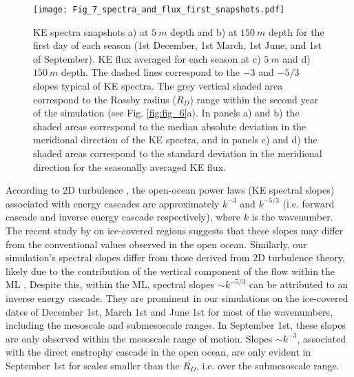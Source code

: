 \documentclass[draft]{agujournal2019}
\begin{document}
\begin{figure}[t!]
  \texttt{[image: Fig\_7\_spectra\_and\_flux\_first\_snapshots.pdf]}
  \caption{KE spectra snapshots a) at $5\ m$ depth and b) at $150\ m$ depth for the first day of each season (1st December, 1st March, 1st June, and 1st of September). KE flux averaged for each season at c) $5\ m$ and d) $150\ m$ depth. The dashed lines correspond to the $-3$ and $-5/3$ slopes typical of KE spectra. The grey vertical shaded area correspond to the Rossby radius ($R_D$) range within the second year of the simulation (see Fig. \ref{fig:fig_6}a). In panels a) and b) the shaded areas correspond to the median absolute deviation in the meridional direction of the KE spectra, and in panels c) and d) the shaded areas correspond to the standard deviation in the meridional direction for the seasonally averaged KE ﬂux.}
  \label{fig:fig_7}
\end{figure}

According to 2D turbulence \citep{Charney_turbulence_1971,Vallis_atmospheric_2017}, the open-ocean power laws (KE spectral slopes) associated with energy cascades are approximately $k^{-3}$ and $k^{-5/3}$ (i.e. forward cascade and inverse energy cascade respectively), where $k$ is the wavenumber. The recent study by \citet{Manucharyan_eddies_2022} on ice-covered regions suggests that these slopes may differ from the conventional values observed in the open ocean. Similarly, our simulation's spectral slopes differ from those derived from 2D turbulence theory, likely due to the contribution of the vertical component of the flow within the ML \citep{Schubert_cascade_2020}. Despite this, within the ML, spectral slopes $\sim k^{-5/3}$ can be attributed to an inverse energy cascade. They are prominent in our simulations on the ice-covered dates of December 1st, March 1st and June 1st for most of the wavenumbers, including the mesoscale and submesoscale ranges. In September 1st, these slopes are only observed within the mesoscale range of motion. Slopes $\sim k^{-3}$, associated with the direct enstrophy cascade in the open ocean, are only evident in September 1st for scales smaller than the $\overline{R_D}$, i.e. over the submesoscale range.
\end{document}

